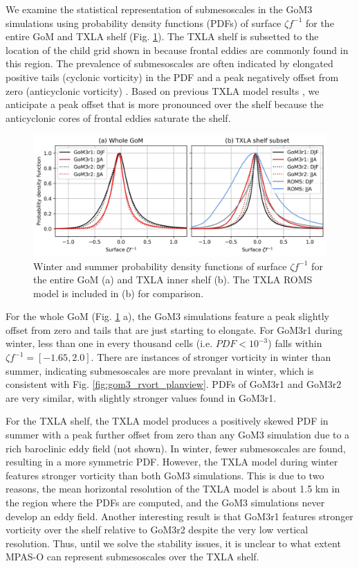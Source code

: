 We examine the statistical representation of submesoscales in the GoM3 simulations using probability density functions (PDFs) of surface $\zeta f^{-1}$ for the entire GoM and TXLA shelf (Fig. \ref{fig:pdfs_gom}). The TXLA shelf is subsetted to the location of the child grid shown in \cite{Schlichting23} because frontal eddies are commonly found in this region. The prevalence of submesoscales are often indicated by elongated positive tails (cyclonic vorticity) in the PDF and a peak negatively offset from zero (anticyclonic vorticity) \citep{McWilliams_2016, Shcherbina_2013, taylor2023submesoscale}. Based on previous TXLA model results \citep{Schlichting23}, we anticipate a peak offset that is more pronounced over the shelf because the anticyclonic cores of frontal eddies saturate the shelf. 

\begin{figure}[t]
\centerline{\includegraphics[width=\textwidth]{figures/scgsr/mpaso_roms_vortpdf.jpg}}
    \caption{Winter and summer probability density functions of surface $\zeta f^{-1}$ for the entire GoM (a) and TXLA inner shelf (b). The TXLA ROMS model is included in (b) for comparison.}
    \label{fig:pdfs_gom}
\end{figure}

For the whole GoM (Fig. \ref{fig:pdfs_gom} a), the GoM3 simulations feature a peak slightly offset from zero and tails that are just starting to elongate. For GoM3r1 during winter, less than one in every thousand cells (i.e. $PDF<10^{-3}$) falls within $\zeta f^{-1} = [-1.65,2.0]$. There are instances of stronger vorticity in winter than summer, indicating submesoscales are more prevalant in winter, which is consistent with Fig. \ref{fig:gom3_rvort_planview}. PDFs of GoM3r1 and GoM3r2 are very similar, with slightly stronger values found in GoM3r1.

For the TXLA shelf, the TXLA model produces a positively skewed PDF in summer with a peak further offset from zero than any GoM3 simulation due to a rich baroclinic eddy field (not shown). In winter, fewer submesoscales are found, resulting in a more symmetric PDF. However, the TXLA model during winter features stronger vorticity than both GoM3 simulations. This is due to two reasons, the mean horizontal resolution of the TXLA model is about 1.5 km in the region where the PDFs are computed, and the GoM3 simulations never develop an eddy field. Another interesting result is that GoM3r1 features stronger vorticity over the shelf relative to GoM3r2 despite the very low vertical resolution. Thus, until we solve the stability issues, it is unclear to what extent MPAS-O can represent submesoscales over the TXLA shelf. 

